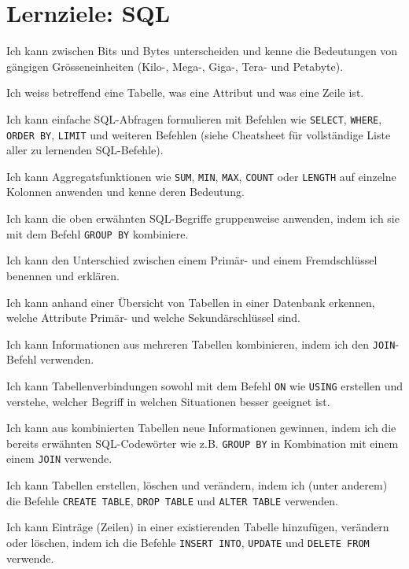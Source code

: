 \section*{Lernziele: SQL}
\begin{todolist}
\item Ich kann zwischen Bits und Bytes unterscheiden und kenne die Bedeutungen von gängigen Grösseneinheiten (Kilo-, Mega-, Giga-, Tera- und Petabyte).
\item Ich weiss betreffend eine Tabelle, was eine Attribut und was eine Zeile ist.
\item Ich kann einfache SQL-Abfragen formulieren mit Befehlen wie \lstinline|SELECT|, \lstinline|WHERE|,  \lstinline|ORDER BY|, \lstinline|LIMIT| und weiteren Befehlen (siehe Cheatsheet für vollständige Liste aller zu lernenden SQL-Befehle).
\item Ich kann Aggregatsfunktionen wie \lstinline|SUM|, \lstinline|MIN|, \lstinline|MAX|, \lstinline|COUNT| oder \lstinline|LENGTH| auf einzelne Kolonnen anwenden und kenne deren Bedeutung.
\item Ich kann die oben erwähnten SQL-Begriffe gruppenweise anwenden, indem ich sie mit dem Befehl \lstinline|GROUP BY| kombiniere.
\item Ich kann den Unterschied zwischen einem Primär- und einem Fremdschlüssel benennen und erklären.
\item Ich kann anhand einer Übersicht von Tabellen in einer Datenbank erkennen, welche Attribute Primär- und welche Sekundärschlüssel sind.
\item Ich kann Informationen aus mehreren Tabellen kombinieren, indem ich den \lstinline|JOIN|-Befehl verwenden.
\item Ich kann Tabellenverbindungen sowohl mit dem Befehl \lstinline|ON| wie \lstinline|USING| erstellen und verstehe, welcher Begriff in welchen Situationen besser geeignet ist.
\item Ich kann aus kombinierten Tabellen neue Informationen gewinnen, indem ich die bereits erwähnten SQL-Codewörter wie z.B. \lstinline|GROUP BY| in Kombination mit einem einem \lstinline|JOIN| verwende.
\item Ich kann Tabellen erstellen, löschen und verändern, indem ich (unter anderem) die Befehle \lstinline|CREATE TABLE|, \lstinline|DROP TABLE| und \lstinline|ALTER TABLE| verwenden.
\item Ich kann Einträge (Zeilen) in einer existierenden Tabelle hinzufügen, verändern oder löschen, indem ich die Befehle \lstinline|INSERT INTO|, \lstinline|UPDATE| und \lstinline|DELETE FROM| verwende.
\end{todolist}